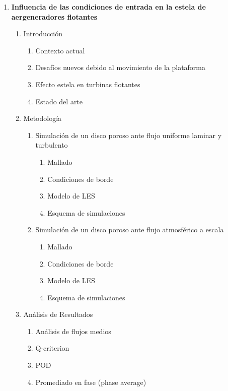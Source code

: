 \begin{enumerate}
  \item \textbf{Influencia de las condiciones de entrada en la estela de aergeneradores flotantes}
  \begin{enumerate}[label*=\arabic*.]
    \item Introducción
    \begin{enumerate}[label*=\arabic*.]
      \item Contexto actual 
      \item Desafíos nuevos debido al movimiento de la plataforma 
      \item Efecto estela en turbinas flotantes
      \item Estado del arte
    \end{enumerate}

	\item Metodología
    \begin{enumerate}[label*=\arabic*.]
      \item Simulación de un disco poroso ante flujo uniforme laminar y turbulento
      \begin{enumerate}[label*=\arabic*.]
      	\item Mallado
      	\item Condiciones de borde
      	\item Modelo de LES
      	\item Esquema de simulaciones
      \end{enumerate}
      \item Simulación de un disco poroso ante flujo atmosférico a escala 
       \begin{enumerate}[label*=\arabic*.]
      	\item Mallado
      	\item Condiciones de borde
      	\item Modelo de LES
      	\item Esquema de simulaciones
      \end{enumerate}
      \end{enumerate}
  \item Análisis de Resultados
  	\begin{enumerate}[label*=\arabic*.]
  	  \item Análisis de flujos medios
	  \item Q-criterion
  	\item POD
 	\item Promediado en fase (phase average)
  	\end{enumerate}


\end{enumerate}
\end{enumerate}
